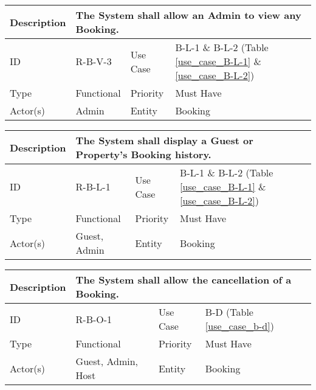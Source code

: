 \begin{tabular}{|p{1.5cm}|p{1.5cm}|p{1.5cm}|p{1.5cm}|p{1.5cm}|p{1.5cm}|p{1.5cm}|p{1.5cm}|p{1.5cm}|p{1.5cm}|p{1.5cm}|p{1.5cm}|}
    \hline
    \multicolumn{2}{|o|}{Description} & \multicolumn{10}{p{12.5cm}|}{The System shall allow an Admin to view any Booking.} \\ \hline
    \multicolumn{2}{|o|}{ID}          & \multicolumn{4}{n}{R-B-V-3}            & \multicolumn{2}{|o|}{Use Case}    & \multicolumn{4}{n|}{B-L-1 \& B-L-2 (Table \ref{use_case_B-L-1} \& \ref{use_case_B-L-2})} \\ \hline
    \multicolumn{2}{|o|}{Type}        & \multicolumn{4}{n}{Functional}         & \multicolumn{2}{|o|}{Priority}    & \multicolumn{4}{n|}{Must Have}  \\ \hline
    \multicolumn{2}{|o|}{Actor(s)}    & \multicolumn{4}{n}{Admin}              & \multicolumn{2}{|o|}{Entity}      & \multicolumn{4}{n|}{Booking} \\ \hline
\end{tabular}

\begin{tabular}{|p{1.5cm}|p{1.5cm}|p{1.5cm}|p{1.5cm}|p{1.5cm}|p{1.5cm}|p{1.5cm}|p{1.5cm}|p{1.5cm}|p{1.5cm}|p{1.5cm}|p{1.5cm}|}
    \hline
    \multicolumn{2}{|o|}{Description} & \multicolumn{10}{p{12.5cm}|}{The System shall display a Guest or Property's Booking history.} \\ \hline
    \multicolumn{2}{|o|}{ID}          & \multicolumn{4}{n}{R-B-L-1}            & \multicolumn{2}{|o|}{Use Case}    & \multicolumn{4}{n|}{B-L-1 \& B-L-2 (Table \ref{use_case_B-L-1} \& \ref{use_case_B-L-2})} \\ \hline
    \multicolumn{2}{|o|}{Type}        & \multicolumn{4}{n}{Functional}         & \multicolumn{2}{|o|}{Priority}    & \multicolumn{4}{n|}{Must Have}  \\ \hline
    \multicolumn{2}{|o|}{Actor(s)}    & \multicolumn{4}{n}{Guest, Admin}       & \multicolumn{2}{|o|}{Entity}      & \multicolumn{4}{n|}{Booking} \\ \hline
\end{tabular}

\begin{tabular}{|p{1.5cm}|p{1.5cm}|p{1.5cm}|p{1.5cm}|p{1.5cm}|p{1.5cm}|p{1.5cm}|p{1.5cm}|p{1.5cm}|p{1.5cm}|p{1.5cm}|p{1.5cm}|}
    \hline
    \multicolumn{2}{|o|}{Description} & \multicolumn{10}{p{12.5cm}|}{The System shall allow the cancellation of a Booking.} \\ \hline
    \multicolumn{2}{|o|}{ID}          & \multicolumn{4}{n}{R-B-O-1}            & \multicolumn{2}{|o|}{Use Case}    & \multicolumn{4}{n|}{B-D (Table \ref{use_case_b-d})}    \\ \hline
    \multicolumn{2}{|o|}{Type}        & \multicolumn{4}{n}{Functional}         & \multicolumn{2}{|o|}{Priority}    & \multicolumn{4}{n|}{Must Have}  \\ \hline
    \multicolumn{2}{|o|}{Actor(s)}    & \multicolumn{4}{n}{Guest, Admin, Host} & \multicolumn{2}{|o|}{Entity}      & \multicolumn{4}{n|}{Booking} \\ \hline
\end{tabular}


